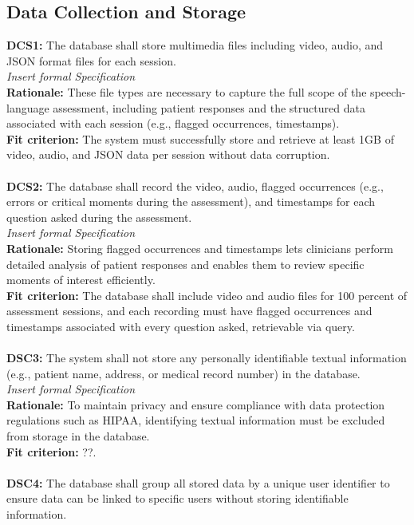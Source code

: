 \documentclass[12pt]{article}
\begin{document}
\subsection{Data Collection and Storage}
\textbf{DCS1: }The database shall store multimedia files including video, audio, and JSON format files for each session.\\
\textit{Insert formal Specification}\\
\textbf{Rationale: } These file types are necessary to capture the full scope of the speech-language assessment, 
including patient responses and the structured data associated with each session (e.g., flagged occurrences, 
timestamps).\\
\textbf{Fit criterion: } The system must successfully store and retrieve at least 1GB of video, audio, and JSON 
data per session without data corruption. \\\\
\textbf{DCS2: }The database shall record the video, audio, flagged occurrences (e.g., errors or critical moments
 during the assessment), and timestamps for each question asked during the assessment.\\
\textit{Insert formal Specification}\\
\textbf{Rationale: } Storing flagged occurrences and timestamps lets clinicians perform detailed analysis 
of patient responses and enables them to review specific moments of interest efficiently.\\
\textbf{Fit criterion: } The database shall include video and audio files for 100 percent of assessment sessions,
 and each recording must have flagged occurrences and timestamps associated with every question asked, 
 retrievable via query. \\\\
\textbf{DSC3: }The system shall not store any personally identifiable textual information (e.g., patient name, address, 
or medical record number) in the database.\\
\textit{Insert formal Specification}\\
\textbf{Rationale: } To maintain privacy and ensure compliance with data protection regulations such as HIPAA, 
identifying textual information must be excluded from storage in the database.\\
\textbf{Fit criterion: } ??.\\\\
\textbf{DSC4: }The database shall group all stored data by a unique user identifier to ensure data can be linked to 
specific users without storing identifiable information.\\
\end{document}
